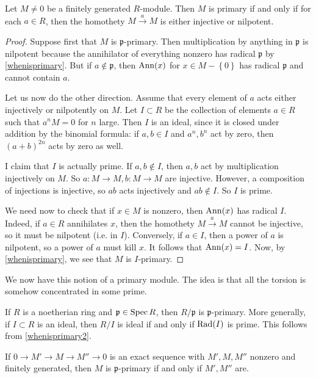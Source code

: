 \begin{proposition} \label{whenisprimary2}
Let $M \neq 0$ be a finitely generated $R$-module. Then $M$ is primary if and
only if for each $a \in
R$, then the homothety $ M \stackrel{a}{\to} M$ is either injective or nilpotent.
\end{proposition}
\begin{proof} 
Suppose first that $M$ is $\mathfrak{p}$-primary. Then multiplication by anything in
$\mathfrak{p}$ is nilpotent because the annihilator of everything nonzero has
radical $\mathfrak{p}$ by \cref{whenisprimary}. But if $a \notin \mathfrak{p}$, then $\operatorname{Ann}(x)$ for
$x \in M - \left\{0\right\}$ has radical $\mathfrak{p}$ and cannot contain $a$. 

Let us now do the other direction. Assume that every element of $a$ acts either injectively or nilpotently on $M$.
Let $I \subset R$ be the collection of elements $a \in R$ such that $a^n M = 0$
for $n$ large. Then $I$ is an ideal, since it is closed under addition by the
binomial formula: if $a, b \in I$ and $a^n, b^n$ act by zero, then $(a+b)^{2n}$
acts by zero as well.


I claim that $I$ is actually prime. If $a,b \notin I$, then  $a,b$ act by
multiplication injectively on $M$. So $a: M \to M, b: M \to M$ are injective.
However, a composition of injections is injective, so $ab$ acts injectively and
$ab \notin I$. So $I$ is prime.

We need now to check that if $x \in M$ is nonzero, then $\operatorname{Ann}(x)$ has radical
$I$. Indeed, if $a \in R$   annihilates $x$,
then the homothety  $M \stackrel{a}{\to} M$ cannot be injective, so it must be
nilpotent (i.e. in $I$). Conversely, if $a \in I$, then a power of $a$ is
nilpotent, so a power of $a$ 
must kill $x$. 
It follows that $\operatorname{Ann}(x) = I$. Now, by \cref{whenisprimary}, we see
that $M$ is $I$-primary.
\end{proof} 

We now have this notion of a primary module. The idea is that all the torsion is
somehow concentrated in some prime.

\begin{example} 
If $R$ is a noetherian ring and $\mathfrak{p} \in \operatorname{Spec} R$, then
$R/\mathfrak{p}$ is $\mathfrak{p}$-primary. More generally, if $I \subset R$
is an ideal, then $R/I$ is ideal if and only if $\operatorname{Rad}(I) $ is prime. This
follows from \cref{whenisprimary2}.
\end{example} 

\begin{exercise} 
If $0 \to M' \to M \to M'' \to 0$ is an exact sequence with $M', M, M''$
nonzero and finitely generated, then $M$ is $\mathfrak{p}$-primary if and only if $M', M''$ are.
\end{exercise} 

